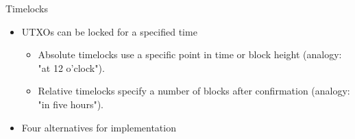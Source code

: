 \documentclass[handout]{beamer}
\begin{document}

\begin{frame}{Timelocks}
	\begin{itemize}
		\item<1-> UTXOs can be locked for a specified time
		\begin{itemize}
			\item<1-> Absolute timelocks use a specific point in time or block height (analogy: "at 12 o'clock").
			\item<1-> Relative timelocks specify a number of blocks after confirmation (analogy: "in five hours").
		\end{itemize}
		\item<2 -> Four alternatives for implementation
	\end{itemize}
	\vspace{0.25cm}
\end{frame}

\end{document}
